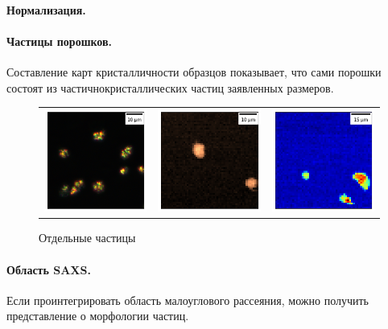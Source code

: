 	\paragraph{Нормализация.}
	
	\paragraph{Частицы порошков.}Составление карт кристалличности образцов показывает, что сами порошки состоят из частичнокристаллических частиц заявленных размеров.
	
	\begin{figure}[h]
	    \centering
	    \begin{tabular}{ccc}
\includegraphics[width=0.33\linewidth]{fig/powder_optic.png}
&
\includegraphics[width=0.33\linewidth]{fig/powder_dif1.png}
&
\includegraphics[width=0.33\linewidth]{fig/powder_dif2.png}
\end{tabular}
	    \caption{Отдельные частицы}
	    \label{fig:powder}
	\end{figure}
	
	\paragraph{Область SAXS.}
	Если проинтегрировать область малоуглового рассеяния, можно получить представление о морфологии частиц.
	
